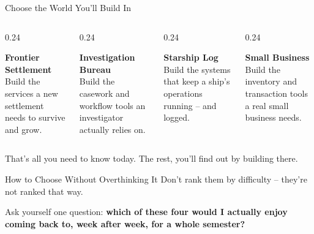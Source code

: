 \documentclass[aspectratio=169]{beamer}
\begin{document}
\begin{frame}{Choose the World You'll Build In}
  \begin{columns}[T]
    \begin{column}{0.24\textwidth}
      \begin{center}
        \textbf{\color{cs2primary}Frontier Settlement}\\[1mm]
        \small\color{cs2inkSoft} Build the services a new settlement needs to survive and grow.
      \end{center}
    \end{column}
    \begin{column}{0.24\textwidth}
      \begin{center}
        \textbf{\color{cs2primary}Investigation Bureau}\\[1mm]
        \small\color{cs2inkSoft} Build the casework and workflow tools an investigator actually relies on.
      \end{center}
    \end{column}
    \begin{column}{0.24\textwidth}
      \begin{center}
        \textbf{\color{cs2primary}Starship Log}\\[1mm]
        \small\color{cs2inkSoft} Build the systems that keep a ship's operations running -- and logged.
      \end{center}
    \end{column}
    \begin{column}{0.24\textwidth}
      \begin{center}
        \textbf{\color{cs2primary}Small Business}\\[1mm]
        \small\color{cs2inkSoft} Build the inventory and transaction tools a real small business needs.
      \end{center}
    \end{column}
  \end{columns}
  \vspace{4mm}
  \small\color{cs2inkSoft}\centering
  That's all you need to know today. The rest, you'll find out by building there.
\end{frame}

\begin{pairdiscussframe}{How to Choose Without Overthinking It}
  Don't rank them by difficulty -- they're not ranked that way.

  \vspace{2mm}
  Ask yourself one question: \textbf{which of these four would I
  actually enjoy coming back to, week after week, for a whole semester?}

\end{pairdiscussframe}
\end{document}

